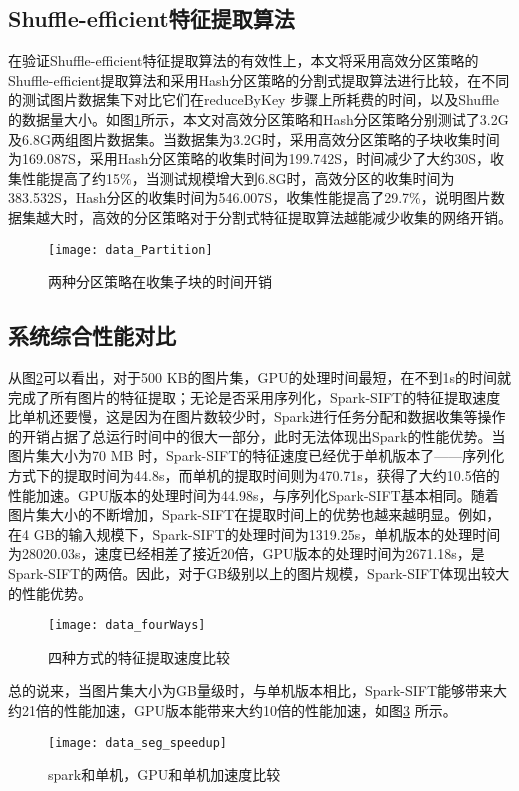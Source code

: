 \subsection{Shuffle-efficient特征提取算法}
在验证Shuffle-efficient特征提取算法的有效性上，本文将采用高效分区策略的Shuffle-efficient提取算法和采用Hash分区策略的分割式提取算法进行比较，在不同的测试图片数据集下对比它们在reduceByKey 步骤上所耗费的时间，以及Shuffle的数据量大小。如图\ref{fig:data_Partition}所示，本文对高效分区策略和Hash分区策略分别测试了3.2G及6.8G两组图片数据集。当数据集为3.2G时，采用高效分区策略的子块收集时间为169.087S，采用Hash分区策略的收集时间为199.742S，时间减少了大约30S，收集性能提高了约15\%，当测试规模增大到6.8G时，高效分区的收集时间为383.532S，Hash分区的收集时间为546.007S，收集性能提高了29.7\%，说明图片数据集越大时，高效的分区策略对于分割式特征提取算法越能减少收集的网络开销。
\begin{figure}[htp]
\centering
\texttt{[image: data\_Partition]}
\caption{两种分区策略在收集子块的时间开销}
\label{fig:data_Partition}
\end{figure}

\subsection{系统综合性能对比}
从图\ref{fig:data_fourWays}可以看出，对于500 KB的图片集，GPU的处理时间最短，在不到1s的时间就完成了所有图片的特征提取；无论是否采用序列化，Spark-SIFT的特征提取速度比单机还要慢，这是因为在图片数较少时，Spark进行任务分配和数据收集等操作的开销占据了总运行时间中的很大一部分，此时无法体现出Spark的性能优势。当图片集大小为70 MB 时，Spark-SIFT的特征速度已经优于单机版本了——序列化方式下的提取时间为44.8s，而单机的提取时间则为470.71s，获得了大约10.5倍的性能加速。GPU版本的处理时间为44.98s，与序列化Spark-SIFT基本相同。随着图片集大小的不断增加，Spark-SIFT在提取时间上的优势也越来越明显。例如，在4 GB的输入规模下，Spark-SIFT的处理时间为1319.25s，单机版本的处理时间为28020.03s，速度已经相差了接近20倍，GPU版本的处理时间为2671.18s，是Spark-SIFT的两倍。因此，对于GB级别以上的图片规模，Spark-SIFT体现出较大的性能优势。
\begin{figure}[htp]
\centering
\texttt{[image: data\_fourWays]}
\caption{四种方式的特征提取速度比较}
\label{fig:data_fourWays}
\end{figure}

总的说来，当图片集大小为GB量级时，与单机版本相比，Spark-SIFT能够带来大约21倍的性能加速，GPU版本能带来大约10倍的性能加速，如图\ref{fig:data_seg_speedup} 所示。
\begin{figure}[htp]
\centering
\texttt{[image: data\_seg\_speedup]}
\caption{spark和单机，GPU和单机加速度比较}
\label{fig:data_seg_speedup}
\end{figure}

